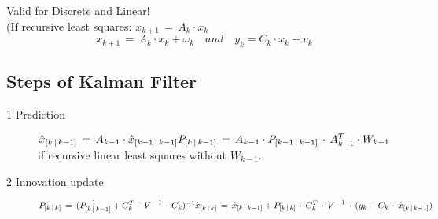\begin{tcolorbox}[colback=violet!5!white,colframe=violet!75!black,title=Kalman Filter]
Valid for Discrete and Linear!\\
(If recursive least squares: \( x_{ k+1 }\, =\, A_{ k }\cdot x_{ k } \)
\begin{equation*}
x_{ k+1 }\, =\, A_{ k }\cdot x_{ k }+\omega _{ k }\quad and\quad y_{ k }=C_{ k }\cdot x_{ k }+v_{ k }
\end{equation*}
\subsection*{Steps of Kalman Filter}
\begin{description}
\item[1 Prediction] $\hat { x } _{ [k\, |\, k-1] }\, =\, A_{ k-1 }\cdot \hat { x } _{ [k-1\, |\, k-1] }\\ P_{ [k\, |\, k-1] }\, =\, A_{ k-1 }\cdot { P }_{ [k-1\, |\, k-1] }\, \cdot \, A_{ k-1 }^{ T }\cdot { W }_{ k-1 }$ \\
if recursive linear least squares without \( { W }_{ k-1 } \).
\item[2 Innovation update] $P_{ [k\, |\, k] }\, =\, (P_{ [k\, |\, k-1] }^{ -1 }+C_{ k }^{ T }\, \cdot \, { V\,  }^{ -1 }\, \cdot \, C_{ k })^{ -1 }\\ \hat { x } _{ [k\, |\, k] }\, =\, \hat { x } _{ [k\, |\, k-1] }+P_{ [k\, |\, k] }\, \cdot \, C_{ k }^{ T }\, \cdot \, { V\,  }^{ -1 }\, \cdot \, (y_{ k }-C_{ k }\, \cdot \, \hat { x } _{ [k\, |\, k-1] })$
\end{description}
\end{tcolorbox}

